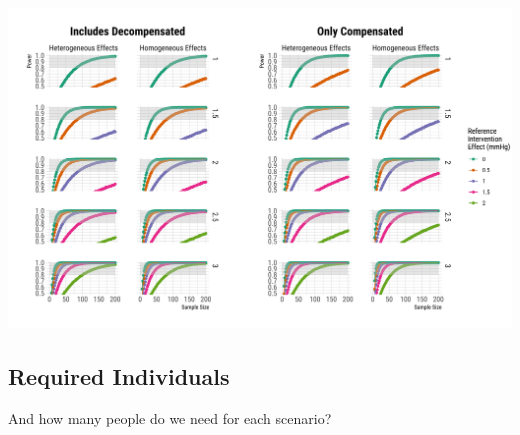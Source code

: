 \documentclass[
]{article}
\begin{document}
\includegraphics{figures/unnamed-chunk-76-1.png}

\hypertarget{required-individuals-1}{%
\subsection{Required Individuals}\label{required-individuals-1}}

And how many people do we need for each scenario?
\end{document}
